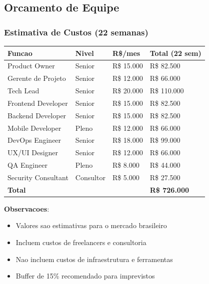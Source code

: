 \subsection{Orcamento de Equipe}

\subsubsection{Estimativa de Custos (22 semanas)}

\begin{longtable}{|p{4cm}|p{2cm}|p{2cm}|p{3cm}|}
\hline
\textbf{Funcao} & \textbf{Nivel} & \textbf{R\$/mes} & \textbf{Total (22 sem)} \\
\hline
\endhead

Product Owner & Senior & R\$ 15.000 & R\$ 82.500 \\
\hline

Gerente de Projeto & Senior & R\$ 12.000 & R\$ 66.000 \\
\hline

Tech Lead & Senior & R\$ 20.000 & R\$ 110.000 \\
\hline

Frontend Developer & Senior & R\$ 15.000 & R\$ 82.500 \\
\hline

Backend Developer & Senior & R\$ 15.000 & R\$ 82.500 \\
\hline

Mobile Developer & Pleno & R\$ 12.000 & R\$ 66.000 \\
\hline

DevOps Engineer & Senior & R\$ 18.000 & R\$ 99.000 \\
\hline

UX/UI Designer & Senior & R\$ 12.000 & R\$ 66.000 \\
\hline

QA Engineer & Pleno & R\$ 8.000 & R\$ 44.000 \\
\hline

Security Consultant & Consultor & R\$ 5.000 & R\$ 27.500 \\
\hline

\textbf{Total} & & & \textbf{R\$ 726.000} \\
\hline

\end{longtable}

\textbf{Observacoes}:
\begin{itemize}
    \item Valores sao estimativas para o mercado brasileiro
    \item Incluem custos de freelancers e consultoria
    \item Nao incluem custos de infraestrutura e ferramentas
    \item Buffer de 15\% recomendado para imprevistos
\end{itemize}
